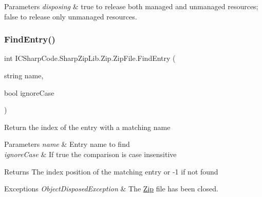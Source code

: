 \begin{DoxyParams}{Parameters}
{\em disposing} & true to release both managed and unmanaged resources; false to release only unmanaged resources.\\
\hline
\end{DoxyParams}
\mbox{\label{class_i_c_sharp_code_1_1_sharp_zip_lib_1_1_zip_1_1_zip_file_a9b10e39458ab994581e85cc47488c517}} 
\subsubsection{\texorpdfstring{Find\+Entry()}{FindEntry()}}
{\footnotesize\ttfamily int I\+C\+Sharp\+Code.\+Sharp\+Zip\+Lib.\+Zip.\+Zip\+File.\+Find\+Entry (\begin{DoxyParamCaption}\item[{string}]{name,  }\item[{bool}]{ignore\+Case }\end{DoxyParamCaption})\hspace{0.3cm}{\ttfamily [inline]}}



Return the index of the entry with a matching name 


\begin{DoxyParams}{Parameters}
{\em name} & Entry name to find\\
\hline
{\em ignore\+Case} & If true the comparison is case insensitive\\
\hline
\end{DoxyParams}
\begin{DoxyReturn}{Returns}
The index position of the matching entry or -\/1 if not found
\end{DoxyReturn}

\begin{DoxyExceptions}{Exceptions}
{\em Object\+Disposed\+Exception} & The \hyperlink{namespace_i_c_sharp_code_1_1_sharp_zip_lib_1_1_zip}{Zip} file has been closed. \\
\hline
\end{DoxyExceptions}
\mbox{\label{class_i_c_sharp_code_1_1_sharp_zip_lib_1_1_zip_1_1_zip_file_a1d49a515fa629d36f64736581d84e3d8}} 
